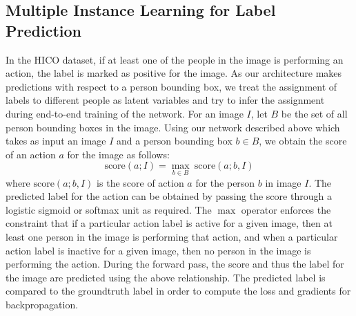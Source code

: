 \documentclass[runningheads]{llncs}
\begin{document}
\subsection{Multiple Instance Learning for Label Prediction}\label{subsec:MIL}
In the HICO dataset, if at least one of the people in the image is performing an action, the label is marked as positive for the image. As our architecture makes predictions with respect to a person bounding box, we treat the assignment of labels to different people as latent variables and try to infer the assignment during end-to-end training of the network. For an image $I$, let $B$ be the set of all person bounding boxes in the image. Using our network described above which takes as input an image $I$ and a person bounding box $b\in B$, we obtain the score of an action $a$ for the image as follows:
\begin{equation}
    \text{score}(a; I) = \max_{b\in B} \ \text{score}(a; b, I)
\end{equation}
where $\text{score}(a; b, I)$ is the score of action $a$ for the person $b$ in image $I$. The predicted label for the action can be obtained by passing the score through a logistic sigmoid or softmax unit as required. The $\max$ operator enforces the constraint that if a particular action label is active for a given image, then at least one person in the image is performing that action, and when a particular action label is inactive for a given image, then no person in the image is performing the action. During the forward pass, the score and thus the label for the image are predicted using the above relationship. The predicted label is compared to the groundtruth label in order to compute the loss and gradients for backpropagation.
\end{document}
